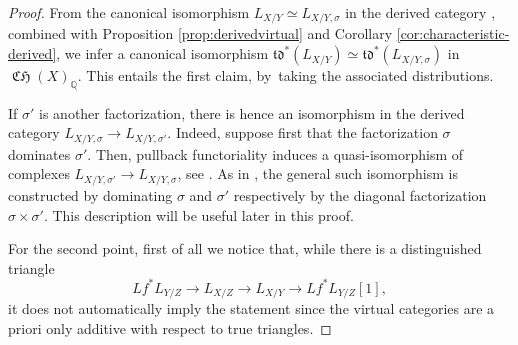 \documentclass[JEP,XML,SOM,Unicode,published]{cedram}
\theoremstyle{plain}
\theoremstyle{definition}
\newcommand{\QBbb}{\mathbb Q}
\newcommand{\tdfrak}{\mathfrak {td}}
\DeclareMathOperator{\CHfrak}{\mathfrak{CH}}
\begin{document}
\begin{proof}
From the canonical isomorphism $L_{X/Y}\simeq L_{X/Y,\sigma}$ in the derived category \cite[\href{https://stacks.math.columbia.edu/tag/08TJ}{08TJ}]{stacks-project}, combined with Proposition \ref{prop:derivedvirtual} and Corollary \ref{cor:characteristic-derived}, we infer a canonical isomorphism
$\tdfrak^{\ast}(L_{X/Y})\simeq \tdfrak^{\ast}(L_{X/Y,\sigma})$ in $\CHfrak(X)_{\QBbb}$. This entails the first claim, by~taking the associated distributions.

If $\sigma'$ is another factorization, there is hence an isomorphism in the derived category $L_{X/Y, \sigma} \to L_{X/Y, \sigma'}$. Indeed, suppose first that the factorization $\sigma$ dominates $\sigma'$. Then, pullback functoriality induces a quasi-isomorphism of complexes $L_{X/Y, \sigma'} \to L_{X/Y, \sigma}$, see \cite[Exp.\,VIII, proof of Prop.\,2.2]{SGA6}. As in \loccit, the general such isomorphism is constructed by dominating $\sigma$ and $\sigma'$ respectively by the diagonal factorization $\sigma \times \sigma'$. This description will be useful later in this proof.

For the second point, first of all we notice that, while there is a distinguished triangle
\begin{displaymath}
Lf^\ast L_{Y/Z} \to L_{X/Z} \to L_{X/Y} \to Lf^\ast L_{Y/Z}[1],
\end{displaymath}
it does not automatically imply the statement since the virtual categories are a priori only additive with respect to true triangles.


\end{proof}
\end{document}
